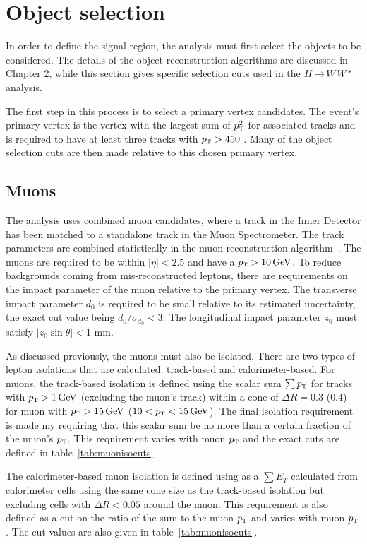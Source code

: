 \section{Object selection}

In order to define the signal region, the analysis must first select the objects to be considered. The details of the object reconstruction algorithms are discussed in Chapter 2, while this section gives specific selection cuts used in the $H{\,{\rightarrow}\,}WW^\ast$ analysis. 

The first step in this process is to select a primary vertex candidates. The event's primary vertex is the vertex with the largest sum of $p_{\textrm{\footnotesize\sc t}}^2$ for associated tracks and is required to have at least three tracks with $p_{\textrm{\footnotesize\sc t}} > 450$ \MeV. Many of the object selection cuts are then made relative to this chosen primary vertex.

\subsection{Muons}

The analysis uses combined muon candidates, where a track in the Inner Detector has been matched to a standalone track in the Muon Spectrometer. The track parameters are combined statistically in the muon reconstruction algorithm~\cite{MuonReco}. The muons are required to be within $|\eta| < 2.5$ and have a $\pT > 10 \GeV$. To reduce backgrounds coming from mis-reconstructed leptons, there are requirements on the impact parameter of the muon relative to the primary vertex. The transverse impact parameter $d_0$ is required to be small relative to its estimated uncertainty, the exact cut value being $d_0/\sigma_{d_0} < 3$. The longitudinal impact parameter $z_0$ must satisfy $\left|z_0\sin\theta\right| < 1$ mm. 

As discussed previously, the muons must also be isolated. There are two types of lepton isolations that are calculated: track-based and calorimeter-based. For muons, the track-based isolation is defined using the scalar sum  $\sum p_{\textrm{\footnotesize\sc t}}$ for tracks with $\pT > 1 \GeV$ (excluding the muon's track) within a cone of  $\Delta R = 0.3$ ($0.4$) for muon with $\pT > 15 \GeV$ ($10 < \pT < 15 \GeV$). The final isolation requirement is made my requiring that this scalar sum be no more than a certain fraction of the muon's $p_{\textrm{\footnotesize\sc t}}$. This requirement varies with muon $p_{\textrm{\footnotesize\sc t}}$ and the exact cuts are defined in table~\ref{tab:muonisocuts}.

The calorimeter-based muon isolation is defined using as a $\sum E_{T}$ calculated from calorimeter cells using the same cone size as the track-based isolation but excluding cells with $\Delta R < 0.05$ around the muon. This requirement is also defined as a cut on the ratio of the sum to the muon $p_{\textrm{\footnotesize\sc t}}$ and varies with muon $p_{\textrm{\footnotesize\sc t}}$. The cut values are also given in table~\ref{tab:muonisocuts}.

